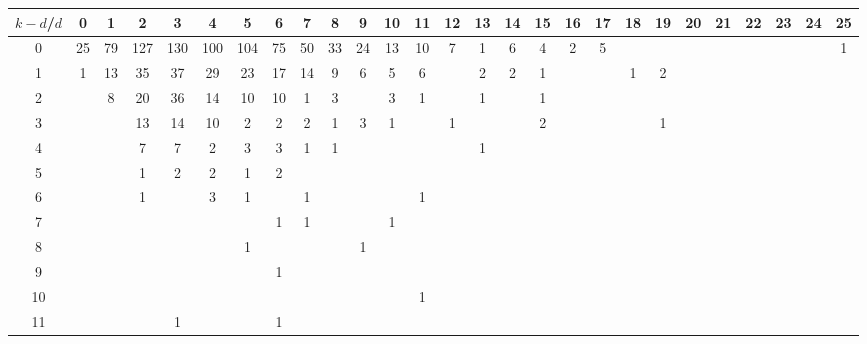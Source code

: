 \documentclass{article}[12pt]
\begin{document}
\begin{landscape}

\begin{table}[h]\footnotesize
{\centering
\begin{tabular}{|c|c|
c|c|c|c|c|c|c|c|c|c|c|c|c|c|c|c|c|c|c|c|c|c|c|c|c|}
  \hline
  $k-d$/$d$ 
 & 0 & 1 & 2 & 3 & 4 & 5 & 6 & 7 & 8 & 9 & 10 & 11 & 12 & 13 & 14 & 15 & 16 & 17 & 18 & 19 & 20 & 21 & 22 & 23 & 24 & 25\\

  \hline
  \hline

0  & 25 & 79 & 127 & 130 & 100 & 104 & 75 & 50 & 33 & 24 & 13 & 10 & 7 & 1 & 6 & 4 & 2 & 5 &  &  &  &  &  &  &  & 1\\

1  & 1 & 13 & 35 & 37 & 29 & 23 & 17 & 14 & 9 & 6 & 5 & 6 &  & 2 & 2 & 1 &  &  & 1 & 2 &  &  &  &  &  & \\

2  &  & 8 & 20 & 36 & 14 & 10 & 10 & 1 & 3 &  & 3 & 1 &  & 1 &  & 1 &  &  &  &  &  &  &  &  &  & \\

3  &  &  & 13 & 14 & 10 & 2 & 2 & 2 & 1 & 3 & 1 &  & 1 &  &  & 2 &  &  &  & 1 &  &  &  &  &  & \\

4  &  &  & 7 & 7 & 2 & 3 & 3 & 1 & 1 &  &  &  &  & 1 &  &  &  &  &  &  &  &  &  &  &  & \\

5  &  &  & 1 & 2 & 2 & 1 & 2 &  &  &  &  &  &  &  &  &  &  &  &  &  &  &  &  &  &  & \\

6  &  &  & 1 &  & 3 & 1 &  & 1 &  &  &  & 1 &  &  &  &  &  &  &  &  &  &  &  &  &  & \\

7  &  &  &  &  &  &  & 1 & 1 &  &  & 1 &  &  &  &  &  &  &  &  &  &  &  &  &  &  & \\

8  &  &  &  &  &  & 1 &  &  &  & 1 &  &  &  &  &  &  &  &  &  &  &  &  &  &  &  & \\

9  &  &  &  &  &  &  & 1 &  &  &  &  &  &  &  &  &  &  &  &  &  &  &  &  &  &  & \\

10  &  &  &  &  &  &  &  &  &  &  &  & 1 &  &  &  &  &  &  &  &  &  &  &  &  &  & \\

11  &  &  &  & 1 &  &  & 1 &  &  &  &  &  &  &  &  &  &  &  &  &  &  &  &  &  &  & \\


\end{tabular}}
\end{table}
\end{landscape}
\end{document}
